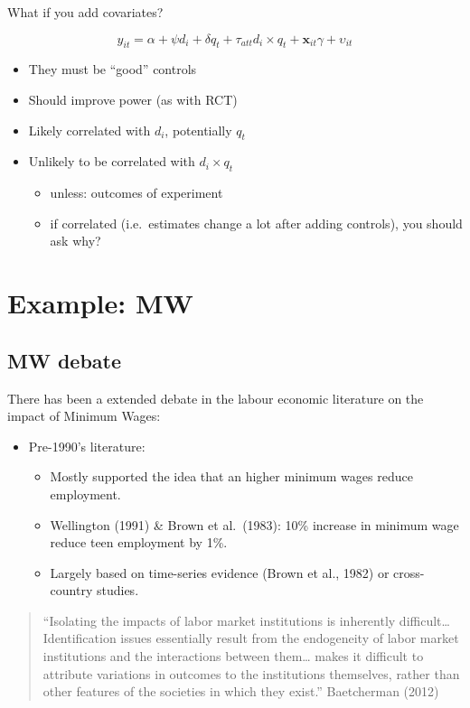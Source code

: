 \documentclass[
  letterpaper,
  DIV=11,
  numbers=noendperiod]{scrartcl}
\begin{document}
What if you add covariates?

\[
  y_{it} = \alpha + \psi d_i + \delta q_t + \tau_{att} d_i\times q_t + \mathbf{x}_{it}\gamma + \upsilon_{it}
\]

\begin{itemize}
\item
  They must be ``good'' controls
\item
  Should improve power (as with RCT)
\item
  Likely correlated with \(d_i\), potentially \(q_t\)
\item
  Unlikely to be correlated with \(d_i\times q_t\)

  \begin{itemize}
  \item
    unless: outcomes of experiment
  \item
    if correlated (i.e.~estimates change a lot after adding controls),
    you should ask why?
  \end{itemize}
\end{itemize}

\section{Example: MW}\label{example-mw}

\subsection{MW debate}\label{mw-debate}

There has been a extended debate in the labour economic literature on
the impact of Minimum Wages:

\begin{itemize}
\item
  Pre-1990's literature:

  \begin{itemize}
  \item
    Mostly supported the idea that an higher minimum wages reduce
    employment.
  \item
    Wellington (1991) \& Brown et al.~(1983): 10\% increase in minimum
    wage reduce teen employment by 1\%.
  \item
    Largely based on time-series evidence (Brown et al., 1982) or
    cross-country studies.
  \end{itemize}
\end{itemize}

\begin{quote}
``Isolating the impacts of labor market institutions is inherently
difficult\ldots{} Identification issues essentially result from the
endogeneity of labor market institutions and the interactions between
them\ldots{} makes it difficult to attribute variations in outcomes to
the institutions themselves, rather than other features of the societies
in which they exist.'' Baetcherman (2012)
\end{quote}
\end{document}
